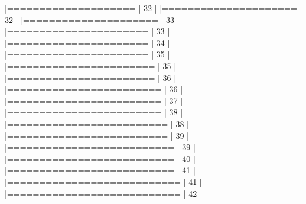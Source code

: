 \documentclass[10pt]{article}
\newenvironment{CodeChunk}{}{}
\begin{document}
\begin{CodeChunk}
\begin{CodeChunk}
\begin{CodeOutput}
  |====================                                             |  32%
  |                                                                       
  |=====================                                            |  32%
  |                                                                       
  |=====================                                            |  33%
  |                                                                       
  |======================                                           |  33%
  |                                                                       
  |======================                                           |  34%
  |                                                                       
  |======================                                           |  35%
  |                                                                       
  |=======================                                          |  35%
  |                                                                       
  |=======================                                          |  36%
  |                                                                       
  |========================                                         |  36%
  |                                                                       
  |========================                                         |  37%
  |                                                                       
  |========================                                         |  38%
  |                                                                       
  |=========================                                        |  38%
  |                                                                       
  |=========================                                        |  39%
  |                                                                       
  |==========================                                       |  39%
  |                                                                       
  |==========================                                       |  40%
  |                                                                       
  |==========================                                       |  41%
  |                                                                       
  |===========================                                      |  41%
  |                                                                       
  |===========================                                      |  42%

\end{CodeOutput}
\end{CodeChunk}
\end{CodeChunk}
\end{document}
